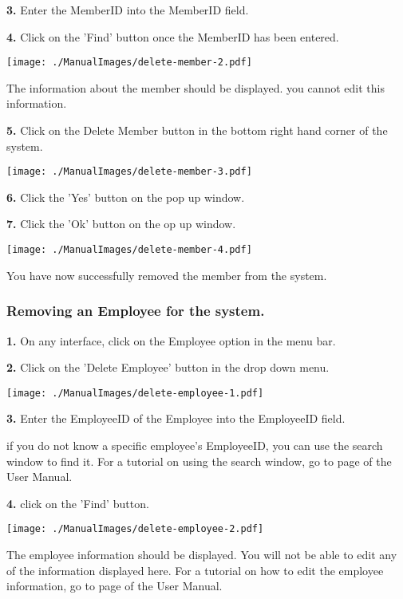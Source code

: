 \textbf{3.} Enter the MemberID into the MemberID field.

\textbf{4.} Click on the 'Find' button once the MemberID has been entered.

\texttt{[image: ./ManualImages/delete-member-2.pdf]}

The information about the member should be displayed. you cannot edit this information.

\textbf{5.} Click on the Delete Member button in the bottom right hand corner of the system. 

\texttt{[image: ./ManualImages/delete-member-3.pdf]}

\textbf{6.} Click the 'Yes' button on the pop up window.

\textbf{7.} Click the 'Ok' button on the op up window.

\texttt{[image: ./ManualImages/delete-member-4.pdf]}

You have now successfully removed the member from the system.

\pagebreak
\subsubsection{Removing an Employee for the system.}
\label{fig:Removing an Employee for the system.}

\textbf{1.} On any interface, click on the Employee option in the menu bar.

\textbf{2.} Click on the 'Delete Employee' button in the drop down menu.

\texttt{[image: ./ManualImages/delete-employee-1.pdf]}

\textbf{3.} Enter the EmployeeID of the Employee into the EmployeeID field.

if you do not know a specific employee's EmployeeID, you can use the search window to find it. For a tutorial on using the search window, go to page \pageref{fig:Using the search window} of the User Manual.

\textbf{4.} click on the 'Find' button.

\texttt{[image: ./ManualImages/delete-employee-2.pdf]}

The employee information should be displayed. You will not be able to edit any of the information displayed here. For a tutorial on how to edit the employee information, go to page \pageref{fig:Editing an Employee in the system} of the User Manual.

